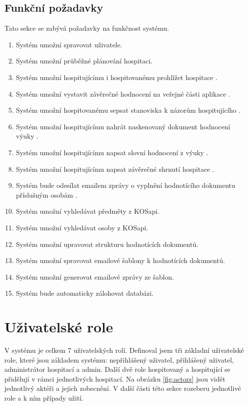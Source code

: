 \subsection{Funkční požadavky}
Tato sekce se zabývá požadavky na funkčnost systému.
\begin{enumerate}
\item Systém umožní spravovat uživatele.
\item Systém umožní průběžné plánování hospitaci.
\item Systém umožní hospitujícímu i hospitovanému prohlížet hospitace \cite{prototyp_documentace}.
\item Systém umožní vystavit závěrečné hodnocení na veřejné části aplikace \cite{prototyp_documentace}. 
\item Systém umožní hospitovanému sepsat stanoviska k názorům hospitujícího \cite{prototyp_documentace}.
\item Systém umožní hospitujícímu nahrát naskenovaný dokument hodnocení výuky \cite{prototyp_documentace}.
\item Systém umožní hospitujícímu napsat slovní hodnocení z výuky \cite{prototyp_documentace}.
\item Systém umožní hospitujícímu napsat závěrečné shrnutí hospitace \cite{prototyp_documentace}.
\item Systém bude odesílat emailem zprávy o vyplnění hodnotícího dokumentu příslušným osobám \cite{prototyp_documentace}.
\item Systém umožní vyhledávat předměty z KOSapi.
\item Systém umožní vyhledávat osoby z KOSapi.
\item Systém umožní upravovat strukturu hodnotících dokumentů.
\item Systém umožní spravovat emailové šablony k hodnotících dokumentů.
\item Systém umožní generovat emailové zprávy ze šablon.
\item Systém bude automaticky zálohovat databázi.
\end{enumerate}

\newpage 
\section{Uživatelské role}
V systému je celkem 7 uživatelských rolí. Definoval jsem tři základní uživatelské role, které jsou základem systému: nepřihlášený uživatel, přihlášený uživatel, administrátor hospitací a admin. Další dvě role hospitovaný a hospitující se přidělují v rámci jednotlivých hospitací. Na obrázku \ref{fig:actors} jsou vidět jednotlivý aktéři a jejich zobecnění. V další části této sekce rozeberu jednotlivé role a k ním případy užití.

